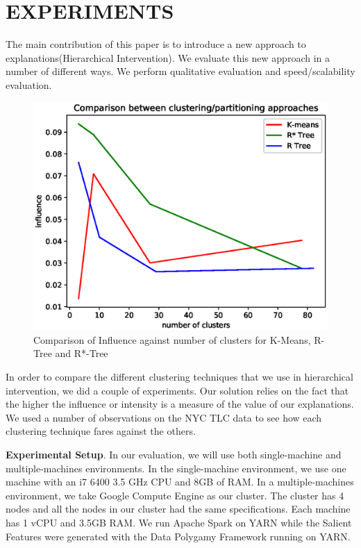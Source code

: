 \section{EXPERIMENTS}
\label{sec:evaluation}
The main contribution of this paper is to introduce a new approach to explanations(Hierarchical Intervention). We evaluate this new approach in a number of different ways. We perform qualitative evaluation and speed/scalability evaluation.

\begin{figure}[h]
	\includegraphics[width=0.96\columnwidth]{images/clustering_comparison}
	\caption{Comparison of Influence against number of clusters for K-Means, R-Tree and R*-Tree}
	\label{fig:clustering_comparison}
\end{figure}

In order to compare the different clustering techniques that we use in hierarchical intervention, we did a couple of experiments. Our solution relies on the fact that the higher the influence or intensity is a measure of the value of our explanations. We used a number of observations on the NYC TLC data to see how each clustering technique fares against the others.

\textbf{Experimental Setup}. 
In our evaluation, we will use both single-machine and multiple-machines environments. 
In the single-machine environment, we use one machine with an i7 6400 3.5 GHz CPU and 8GB of RAM. 
In a multiple-machines environment, we take Google Compute Engine as our cluster. 
The cluster has 4 nodes and all the nodes in our cluster had the same specifications.
Each machine has 1 vCPU and 3.5GB RAM.
We run Apache Spark on YARN while the Salient Features were generated with the Data Polygamy Framework running on YARN. 

